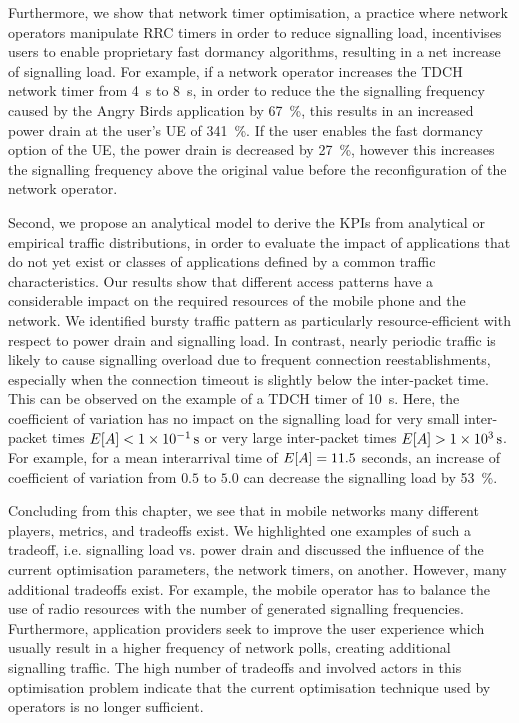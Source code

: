 Furthermore, we show that network timer optimisation, a practice where network operators manipulate \gls{RRC} timers in order to reduce signalling load, incentivises users to enable proprietary fast dormancy algorithms, resulting in a net increase of signalling load.
For example, if a network operator increases the \gls{TDCH} network timer from \SI{4}{\second} to \SI{8}{\second}, in order to reduce the the signalling frequency caused by the Angry Birds application by \SI{67}{\percent}, this results in an increased power drain at the user's \gls{UE} of \SI{341}{\percent}.
If the user enables the fast dormancy option of the \gls{UE}, the power drain is decreased by \SI{27}{\percent}, however this increases the signalling frequency above the original value before the reconfiguration of the network operator.

Second, we propose an analytical model to derive the \glspl{KPI} from analytical or empirical traffic distributions, in order to evaluate the impact of applications that do not yet exist or classes of applications defined by a common traffic characteristics.
Our results show that different access patterns have a considerable impact on the required resources of the mobile phone and the network.
We identified bursty traffic pattern as particularly resource-efficient with respect to power drain and signalling load.
In contrast, nearly periodic traffic is likely to cause signalling overload due to frequent connection reestablishments, especially when the connection timeout is slightly below the inter-packet time.
This can be observed on the example of a \gls{TDCH} timer of \SI{10}{\second}.
Here, the coefficient of variation has no impact on the signalling load for very small inter-packet times \(E[A]<\SI{1e-1}{\second}\) or very large inter-packet times \(E[A]>\SI{1e3}{\second}\).
For example, for a mean interarrival time of \(E[A] = 11.5\) seconds, an increase of coefficient of variation from \(0.5\) to \(5.0\) can decrease the signalling load by \SI{53}{\percent}.

Concluding from this chapter, we see that in mobile networks many different players, metrics, and tradeoffs exist.
We highlighted one examples of such a tradeoff, i.e. signalling load vs. power drain and discussed the influence of the current optimisation parameters, the network timers, on another.
However, many additional tradeoffs exist.
For example, the mobile operator has to balance the use of radio resources with the number of generated signalling frequencies.
Furthermore, application providers seek to improve the user experience which usually result in a higher frequency of network polls, creating additional signalling traffic.
The high number of tradeoffs and involved actors in this optimisation problem indicate that the current optimisation technique used by operators is no longer sufficient.

